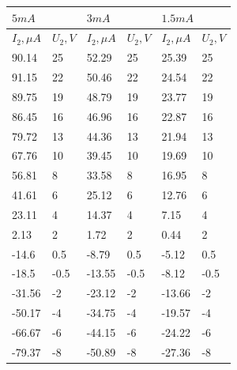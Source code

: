 \documentclass[a4paper,12pt]{article}
\begin{document}
\begin{table}[h]
\centering
\begin{tabular}{|l|l|l|l|l|l|}
\hline
\multicolumn{2}{|l|}{$5mA$} & \multicolumn{2}{l|}{$3mA$} & \multicolumn{2}{l|}{$1.5mA$} \\ \hline
$I_2, \mu A$    & $U_2, V$   & $I_2, \mu A$   & $U_2, V$   & $I_2, \mu A$    & $U_2, V$    \\ \hline
90.14           & 25        & 52.29          & 25        & 25.39           & 25         \\ \hline
91.15           & 22        & 50.46          & 22        & 24.54           & 22         \\ \hline
89.75           & 19        & 48.79          & 19        & 23.77           & 19         \\ \hline
86.45           & 16        & 46.96          & 16        & 22.87           & 16         \\ \hline
79.72           & 13        & 44.36          & 13        & 21.94           & 13         \\ \hline
67.76           & 10        & 39.45          & 10        & 19.69           & 10         \\ \hline
56.81           & 8         & 33.58          & 8         & 16.95           & 8          \\ \hline
41.61           & 6         & 25.12          & 6         & 12.76           & 6          \\ \hline
23.11           & 4         & 14.37          & 4         & 7.15            & 4          \\ \hline
2.13            & 2         & 1.72           & 2         & 0.44            & 2          \\ \hline
-14.6           & 0.5       & -8.79          & 0.5       & -5.12           & 0.5        \\ \hline
-18.5           & -0.5      & -13.55         & -0.5      & -8.12           & -0.5       \\ \hline
-31.56          & -2        & -23.12         & -2        & -13.66          & -2         \\ \hline
-50.17          & -4        & -34.75         & -4        & -19.57          & -4         \\ \hline
-66.67          & -6        & -44.15         & -6        & -24.22          & -6         \\ \hline
-79.37          & -8        & -50.89         & -8        & -27.36          & -8         \\ \hline

\end{tabular}
\end{table}
\end{document}
